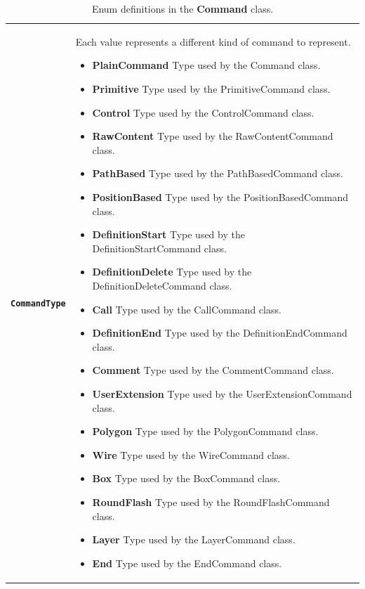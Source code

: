 \documentclass[11pt,twoside,openany,x11names,svgnames]{memoir}
\begin{document}
\begin{table}[h]\footnotesize
\centering
\begin{tabular}{| >{\bfseries}p{3cm} | p{12.5cm} |}
	\hline
	
	\texttt{CommandType} & \parbox[t]{12.5cm}{Each value represents a different kind of command to represent.\\
	                                          \begin{itemize}
						                     	\item \textbf{PlainCommand} Type used by the Command class.
						                       	\item \textbf{Primitive} Type used by the PrimitiveCommand class.
						                       	\item \textbf{Control} Type used by the ControlCommand class.
						                       	\item \textbf{RawContent} Type used by the RawContentCommand class.
						                       	\item \textbf{PathBased} Type used by the PathBasedCommand class.
						                       	\item \textbf{PositionBased} Type used by the PositionBasedCommand class.
						                       	\item \textbf{DefinitionStart} Type used by the DefinitionStartCommand class.
						                       	\item \textbf{DefinitionDelete} Type used by the DefinitionDeleteCommand class.
						                       	\item \textbf{Call} Type used by the CallCommand class.
						                       	\item \textbf{DefinitionEnd} Type used by the DefinitionEndCommand class.
						                       	\item \textbf{Comment} Type used by the CommentCommand class.
						                       	\item \textbf{UserExtension} Type used by the UserExtensionCommand class.
						                       	\item \textbf{Polygon} Type used by the PolygonCommand class.
						                       	\item \textbf{Wire} Type used by the WireCommand class.
						                       	\item \textbf{Box} Type used by the BoxCommand class.
						                       	\item \textbf{RoundFlash} Type used by the RoundFlashCommand class.
						                       	\item \textbf{Layer} Type used by the LayerCommand class.
						                       	\item \textbf{End} Type used by the EndCommand class.
						                     \end{itemize}
						                    } \\
	
	\hline		
\end{tabular}
\caption{Enum definitions in the \textbf{Command} class.}
\label{tab:Command-Types}
\end{table}
\end{document}
